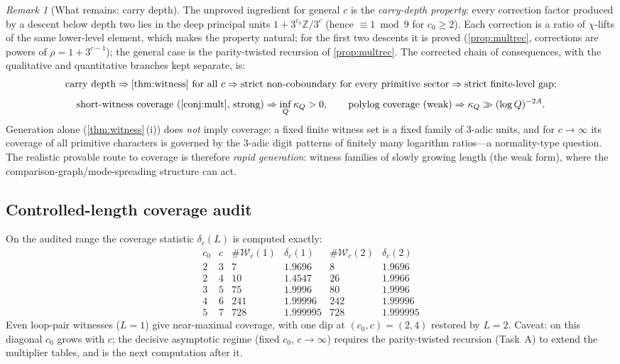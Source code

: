 \documentclass[11pt]{article}
\newcommand{\Z}{\mathbb{Z}}
\theoremstyle{plain}
\theoremstyle{definition}
\theoremstyle{remark}
\newtheorem*{remark}{Remark}
\begin{document}
\begin{remark}[What remains: carry depth]
The unproved ingredient for general $c$ is the \emph{carry-depth property}:
every correction factor produced by a descent below depth two lies in the deep
principal units $1+3^{c_0}\Z/3^c$ (hence $\equiv1\bmod9$ for $c_0\ge2$). Each
correction is a ratio of $\chi$-lifts of the same lower-level element, which
makes the property natural; for the first two descents it is proved
(\cref{prop:multrec}, corrections are powers of $\rho=1+3^{c-1}$); the general
case is the parity-twisted recursion of \cref{prop:multrec}. The corrected
chain of consequences, with the qualitative and quantitative branches kept
separate, is:
\[
\text{carry depth}
\Rightarrow
\text{\cref{thm:witness} for all }c
\Rightarrow
\text{strict non-coboundary for every primitive sector}
\Rightarrow
\text{strict finite-level gap;}
\]
\[
\text{short-witness coverage (\cref{conj:mult}, strong)}
\Rightarrow
\inf_Q\kappa_Q>0,
\qquad
\text{polylog coverage (weak)}
\Rightarrow
\kappa_Q\gg(\log Q)^{-2A} .
\]
Generation alone (\cref{thm:witness}\,(i)) does \emph{not} imply coverage: a
fixed finite witness set is a fixed family of $3$-adic units, and for $c\to\infty$
its coverage of all primitive characters is governed by the $3$-adic digit
patterns of finitely many logarithm ratios---a normality-type question. The
realistic provable route to coverage is therefore \emph{rapid generation}:
witness families of slowly growing length (the weak form), where the
comparison-graph/mode-spreading structure can act.
\end{remark}

\subsection*{Controlled-length coverage audit}

On the audited range the coverage statistic $\delta_c(L)$ is computed exactly:
\[
\begin{array}{cc|cc|cc}
c_0 & c & \#\mathcal W_c(1) & \delta_c(1) & \#\mathcal W_c(2) & \delta_c(2)\\\hline
2 & 3 & 7 & 1.9696 & 8 & 1.9696\\
2 & 4 & 10 & 1.4547 & 26 & 1.9966\\
3 & 5 & 75 & 1.9996 & 80 & 1.9996\\
4 & 6 & 241 & 1.99996 & 242 & 1.99996\\
5 & 7 & 728 & 1.999995 & 728 & 1.999995
\end{array}
\]
Even loop-pair witnesses ($L=1$) give near-maximal coverage, with one dip at
$(c_0,c)=(2,4)$ restored by $L=2$. Caveat: on this diagonal $c_0$ grows with
$c$; the decisive asymptotic regime (fixed $c_0$, $c\to\infty$) requires the
parity-twisted recursion (Task~A) to extend the multiplier tables, and is the
next computation after it.
\end{document}
